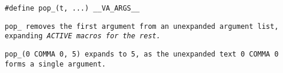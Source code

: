 
\tt{#define pop_(t, ...) __VA_ARGS__}


\tt{pop_} removes the first argument from an unexpanded argument list,
expanding \it{\tt{ACTIVE}} macros for the rest.

\example \tt{pop_(0 COMMA 0, 5)} expands to \tt{5},
as the unexpanded text \tt{0 COMMA 0} forms a single argument.
